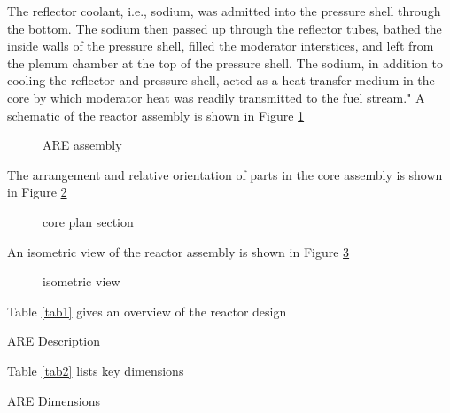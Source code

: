 \documentclass[ms,a4paper]{memoir}
\newcommand*{\msrarchive}{../../msr-archive}%
\begin{document}
The reflector coolant, i.e., sodium, was admitted into the pressure shell through the bottom. The sodium then passed up through the reflector tubes, bathed the inside walls of the pressure shell, filled the moderator interstices, and left from the plenum chamber at the top of the pressure shell. The sodium, in addition to cooling the reflector and pressure shell, acted as a heat transfer medium in the core by which moderator heat was readily transmitted to the fuel stream." A schematic of the reactor assembly is shown in Figure \ref{fig1}

\begin{figure}[H]
  \centering
  \caption{ARE assembly \parencite[Figure 2.2]{ornl-1845}}
  \label{fig1}
\end{figure}

The arrangement and relative orientation of parts in the core assembly is shown in Figure \ref{fig2}

\begin{figure}[H]
  \centering
  \caption{core plan section \parencite[Figure 2.3]{ornl-1845}}
  \label{fig2}
\end{figure}

An isometric view of the reactor assembly is shown in Figure \ref{fig4}

\begin{figure}[H]
  \centering
  \caption{isometric view \parencite[Figure 2.8]{ornl-1845}}
  \label{fig4}
\end{figure}

Table \ref{tab1} gives an overview of the reactor design

\begin{table}[H]
  \centering
  \caption{ARE Description \parencite[Appendix B.1]{ornl-1845}}
  \label{tab1}
\end{table}

Table \ref{tab2} lists key dimensions

\begin{table}[H]
  \centering
  \caption{ARE Dimensions \parencite[Appendix B.2]{ornl-1845}}
  \label{tab2}
\end{table}
\end{document}
